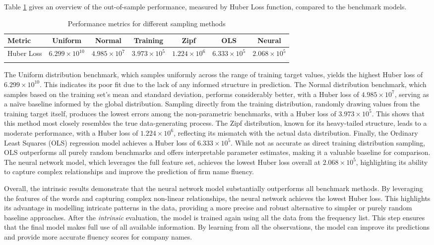 \documentclass[a4paper,11pt]{report}
\begin{document}
\noindent Table \ref{tab:intrinsic} gives an overview of the out-of-sample performance, measured by Huber Loss function, compared to the benchmark models.
\begin{table}[h!]
\centering
\renewcommand{\arraystretch}{1.5} %
\caption{Performance metrics for different sampling methods}
\begin{tabular}{lcccccc}
\hline
\textbf{Metric} & \textbf{Uniform} & \textbf{Normal} & \textbf{Training} & \textbf{Zipf} & \textbf{OLS} & \textbf{Neural} \\
\hline
Huber Loss & $6.299 \times 10^{10}$ & $4.985 \times 10^{7}$ & $3.973 \times 10^{5}$ & $1.224 \times 10^{6}$ & $6.333 \times 10^{5}$ & $2.068 \times 10^{5}$ \\
\hline
\label{tab:intrinsic}
\end{tabular}
\end{table}

\noindent The Uniform distribution benchmark, which samples uniformly across the range of training target values, yields the highest Huber loss of $6.299 \times 10^{10}$. This indicates its poor fit due to the lack of any informed structure in prediction. The Normal distribution benchmark, which samples based on the training set's mean and standard deviation, performs considerably better, with a Huber loss of $4.985 \times 10^{7}$, serving as a naïve baseline informed by the global distribution. Sampling directly from the training distribution, randomly drawing values from the training target itself, produces the lowest errors among the non-parametric benchmarks, with a Huber loss of $3.973 \times 10^{5}$. This shows that this method most closely resembles the true data-generating process. The Zipf distribution, known for its heavy-tailed structure, leads to a moderate performance, with  a Huber loss of $1.224 \times 10^{6}$, reflecting its mismatch with the actual data distribution. Finally, the Ordinary Least Squares (OLS) regression model achieves a Huber loss of $6.333 \times 10^{5}$. While not as accurate as direct training distribution sampling, OLS outperforms all purely random benchmarks and offers interpretable parameter estimates, making it a valuable baseline for comparison. The neural network model, which leverages the full feature set, achieves the lowest Huber loss overall at $2.068 \times 10^{5}$, highlighting its ability to capture complex relationships and improve the prediction of firm name fluency.

Overall, the intrinsic results demonstrate that the neural network model substantially outperforms all benchmark methods. By leveraging the features of the words and capturing complex non-linear relationships, the neural network achieves the lowest Huber loss. This highlights its advantage in modelling intricate patterns in the data, providing a more precise and robust alternative to simpler or purely random baseline approaches.
After the \textit{intrinsic} evaluation, the model is trained again using all the data from the frequency list. This step ensures that the final model makes full use of all available information. By learning from all the observations, the model can improve its predictions and provide more accurate fluency scores for company names.
\end{document}
